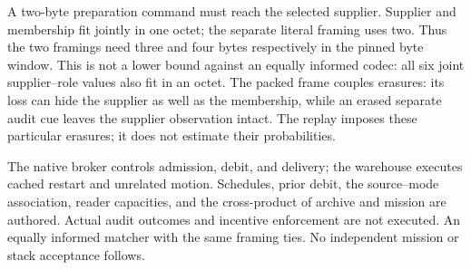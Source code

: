 \documentclass{article}
\begin{document}
A two-byte preparation command must reach the selected supplier.
Supplier and membership fit jointly in one octet; the separate literal
framing uses two. Thus the two framings need three and four bytes
respectively in the pinned byte window. This is not a lower bound
against an equally informed codec: all six joint supplier--role values
also fit in an octet. The packed frame couples erasures: its loss can
hide the supplier as well as the membership, while an erased separate
audit cue leaves the supplier observation intact. The replay imposes
these particular erasures; it does not estimate their probabilities.

The native broker controls admission, debit, and delivery; the warehouse
executes cached restart and unrelated motion. Schedules, prior debit,
the source--mode association, reader capacities, and the cross-product
of archive and mission are authored. Actual audit outcomes and incentive
enforcement are not executed. An equally informed matcher with the same
framing ties. No independent mission or stack acceptance follows.
\end{document}
